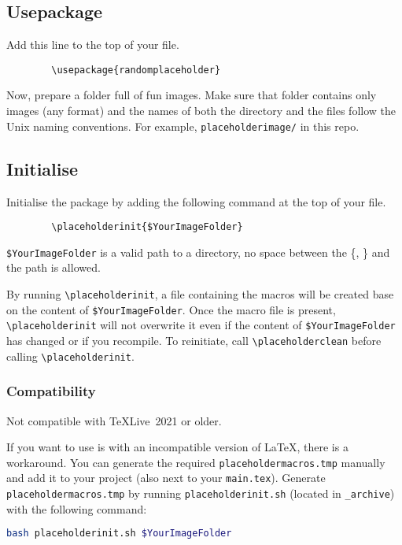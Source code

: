 \documentclass[12pt]{article}
\begin{document}
    \subsection{Usepackage}
    Add this line to the top of your file.
    \begin{lstlisting}
        \usepackage{randomplaceholder}
    \end{lstlisting}

    Now, prepare a folder full of fun images. Make sure that folder contains only images (any format) and the names of both the directory and the files follow the Unix naming conventions. For example, \lstinline{placeholderimage/} in this repo.

    \subsection{Initialise}
    Initialise the package by adding the following command at the top of your file.
    \begin{lstlisting}        
        \placeholderinit{$YourImageFolder}
    \end{lstlisting}
    \lstinline{$YourImageFolder} is a valid path to a directory, no space between the \{, \} and the path is allowed.
    
    By running \lstinline{\placeholderinit}, a file containing the macros will be created base on the content of \lstinline{$YourImageFolder}. 
    Once the macro file is present, \lstinline{\placeholderinit} will not overwrite it even if the content of \lstinline{$YourImageFolder} has changed or if you recompile. 
    To reinitiate, call \lstinline{\placeholderclean} before calling \lstinline{\placeholderinit}.

    \subsubsection{Compatibility}
    Not compatible with TeXLive~2021 or older.

    If you want to use is with an incompatible version of \LaTeX, there is a workaround.
    You can generate the required \lstinline{placeholdermacros.tmp} manually and add it to your project (also next to your \lstinline{main.tex}). 
    Generate \lstinline{placeholdermacros.tmp} by running \lstinline{placeholderinit.sh} (located in \lstinline{_archive}) with the following command:
    \begin{lstlisting}[language=bash]
        bash placeholderinit.sh $YourImageFolder
    \end{lstlisting}
\end{document}
